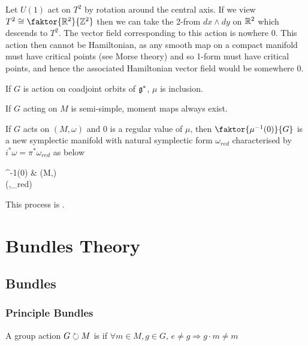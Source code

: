\documentclass{article}
\begin{document}
\begin{example}
	Let $U(1)$ act on $T^2$ by rotation around the central axis. If we view $T^2 \cong \faktor{\mbb{R}^2}{\mbb{Z}^2}$ then we can take the 2-from $dx\wedge dy$ on $\mathbb{R}^2$ which descends to $T^2$. The vector field corresponding to this action is nowhere 0. This action then cannot be Hamiltonian, as any smooth map on a compact manifold must have critical points (see Morse theory) and so 1-form must have critical points, and hence the associated Hamiltonian vector field would be somewhere 0. 
\end{example}

\begin{example}
	If $G$ is action on coadjoint orbits of $\mathfrak{g}^\ast$, $\mu$ is inclusion. 
\end{example}

\begin{prop}
	If $G$ acting on $M$ is semi-simple, moment maps always exist. 
\end{prop}

\begin{prop}
	If $G$ acts on $(M,\omega)$ and $0$ is a regular value of $\mu$, then $\faktor{\mu^{-1}(0)}{G}$ is a new symplectic manifold with natural symplectic form $\omega_{red}$ characterised by $i^\ast \omega = \pi^\ast \omega_{red}$ as below 
	\begin{tkz}
		\mu^{-1}(0) \arrow[r,"i",hook] \arrow[d,"\pi"'] & (M,\omega) \\
		(,\omega_{red})
	\end{tkz}
This process is .
\end{prop}

\section{Bundles Theory}

\subsection{Bundles}
\subsubsection{Principle Bundles}
\begin{definition}
A group action $G \circlearrowright M$ is  if $\forall m \in M, g \in G, \, e \neq g \Rightarrow g\cdot m \neq m$
\end{definition}
\end{document}
